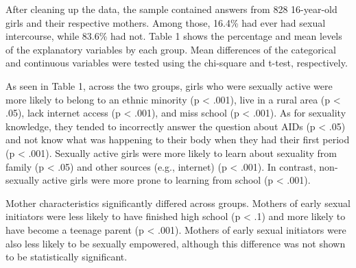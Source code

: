 \documentclass[
]{article}
\begin{document}
After cleaning up the data, the sample contained answers from 828
16-year-old girls and their respective mothers. Among those, 16.4\% had
ever had sexual intercourse, while 83.6\% had not. Table 1 shows the
percentage and mean levels of the explanatory variables by each group.
Mean differences of the categorical and continuous variables were tested
using the chi-square and t-test, respectively.

As seen in Table 1, across the two groups, girls who were sexually
active were more likely to belong to an ethnic minority (p \textless{}
.001), live in a rural area (p \textless{} .05), lack internet access (p
\textless{} .001), and miss school (p \textless{} .001). As for
sexuality knowledge, they tended to incorrectly answer the question
about AIDs (p \textless{} .05) and not know what was happening to their
body when they had their first period (p \textless{} .001). Sexually
active girls were more likely to learn about sexuality from family (p
\textless{} .05) and other sources (e.g., internet) (p \textless{}
.001). In contrast, non-sexually active girls were more prone to
learning from school (p \textless{} .001).

Mother characteristics significantly differed across groups. Mothers of
early sexual initiators were less likely to have finished high school (p
\textless{} .1) and more likely to have become a teenage parent (p
\textless{} .001). Mothers of early sexual initiators were also less
likely to be sexually empowered, although this difference was not shown
to be statistically significant.
\end{document}
